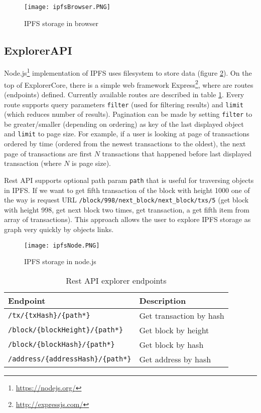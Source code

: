 \begin{figure}[h]
    \centering
    \texttt{[image: ipfsBrowser.PNG]}
    \caption{IPFS storage in browser}
    \label{browserIPFS}
\end{figure}


\subsection{ExplorerAPI}
Node.js\footnote{\url{https://nodejs.org/}} implementation of IPFS uses filesystem to store data (figure \ref{nodeIPFS}). On the top of ExplorerCore, there is a simple web framework Express\footnote{\url{http://expressjs.com/}}, where are routes (endpoints) defined. Currently available routes are described in table \ref{tab:explorerApiEndpoints}. Every route supports query parameters \texttt{filter} (used for filtering results) and \texttt{limit} (which reduces number of results). Pagination can be made by setting \texttt{filter} to be greater/smaller (depending on ordering) as key of the last displayed object and \texttt{limit} to page size. For example, if a user is looking at page of transactions ordered by time (ordered from the newest transactions to the oldest), the next page of transactions are first \(N\) transactions that happened before last displayed transaction (where \(N\) is page size).

Rest API supports optional path param \texttt{path} that is useful for traversing objects in IPFS. If we want to get fifth transaction of the block with height 1000 one of the way is request URL \texttt{/block/998/next\_block/next\_block/txs/5} (get block with height 998, get next block two times, get transaction, a get fifth item from array of transactions). This approach allows the user to explore IPFS storage as graph very quickly by objects links.

\begin{figure}[h]
    \centering
    \texttt{[image: ipfsNode.PNG]}
    \caption{IPFS storage in node.js}
    \label{nodeIPFS}
\end{figure}


\begin{table}[h]
    \centering
    \begin{tabular}{|l|l|}
    \hline
    Endpoint                           & Description                       \\ \hline
    \texttt{/tx/\{txHash\}/\{path*\}}           & Get transaction by hash  \\ \hline
    \texttt{/block/\{blockHeight\}/\{path*\}}   & Get block by height      \\ \hline
    \texttt{/block/\{blockHash\}/\{path*\}}     & Get block by hash        \\ \hline
    \texttt{/address/\{addressHash\}/\{path*\}} & Get address by hash      \\ \hline
    \end{tabular}
    \caption{Rest API explorer endpoints}
    \label{tab:explorerApiEndpoints}
\end{table}
